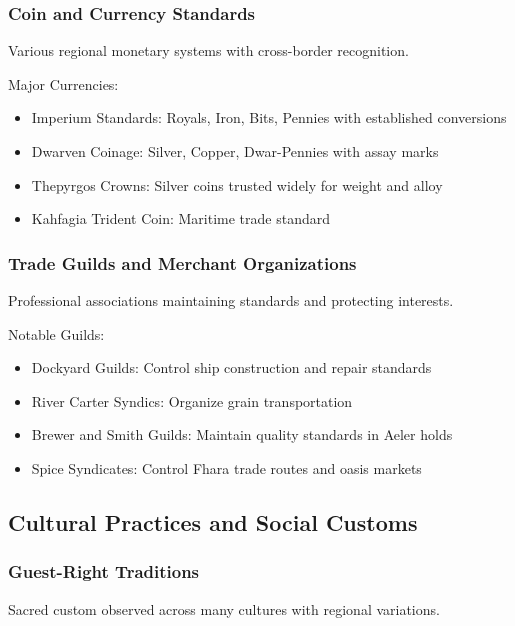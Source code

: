 \subsubsection{Coin and Currency Standards}
\label{sec:currency}

Various regional monetary systems with cross-border recognition.
 
Major Currencies:
\begin{itemize}
    \item Imperium Standards: Royals, Iron, Bits, Pennies with established conversions
    \item Dwarven Coinage: Silver, Copper, Dwar-Pennies with assay marks
    \item Thepyrgos Crowns: Silver coins trusted widely for weight and alloy
    \item Kahfagia Trident Coin: Maritime trade standard
\end{itemize}

\subsubsection{Trade Guilds and Merchant Organizations}
\label{sec:guilds}

Professional associations maintaining standards and protecting interests.

Notable Guilds:
\begin{itemize}
    \item Dockyard Guilds: Control ship construction and repair standards
    \item River Carter Syndics: Organize grain transportation
    \item Brewer and Smith Guilds: Maintain quality standards in Aeler holds
    \item Spice Syndicates: Control Fhara trade routes and oasis markets
\end{itemize}

\subsection{Cultural Practices and Social Customs}

\subsubsection{Guest-Right Traditions}
\label{sec:guestright}

Sacred custom observed across many cultures with regional variations.

